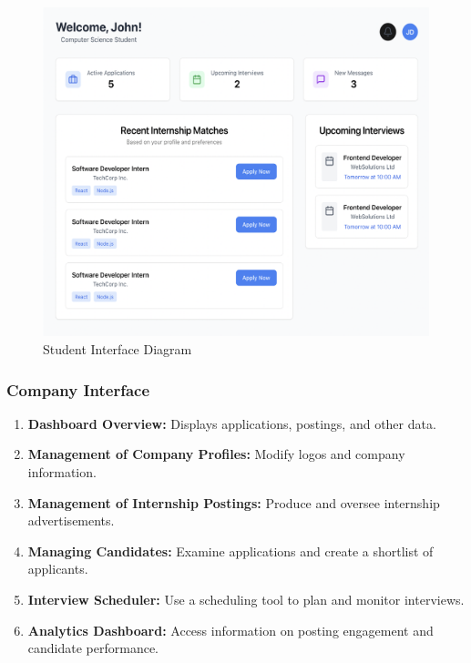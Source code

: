 \begin{figure}[H]
    \begin{center}
        \includegraphics[width=0.82\linewidth]{JhaBhatiaSharma/Images/Mockups/StudentInterface.png}
        \caption{Student Interface Diagram}
        \label{fig:StudentInterface}%
    \end{center}
\end{figure}

\subsubsection{Company Interface}
\begin{enumerate}
    \item \textbf{Dashboard Overview:} Displays applications, postings, and other data.
    \item \textbf{Management of Company Profiles:} Modify logos and company information.
    \item \textbf{Management of Internship Postings:} Produce and oversee internship advertisements.
    \item \textbf{Managing Candidates:} Examine applications and create a shortlist of applicants.
    \item \textbf{Interview Scheduler:} Use a scheduling tool to plan and monitor interviews.
    \item \textbf{Analytics Dashboard:} Access information on posting engagement and candidate performance.
\end{enumerate}

